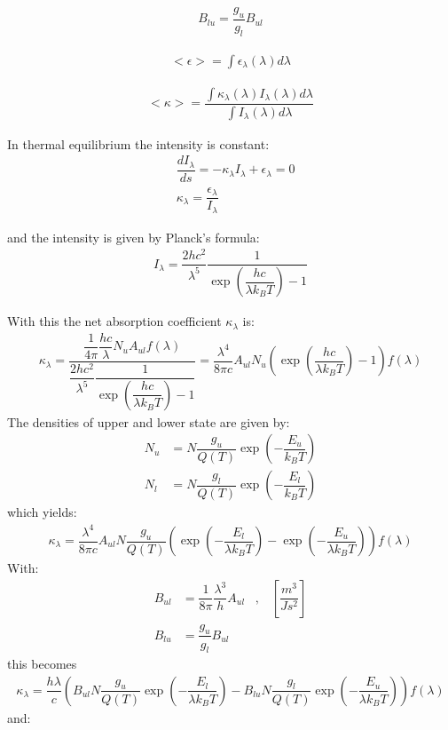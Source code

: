 \begin{align}
B_{lu} = \dfrac{g_u}{g_l} B_{ul}
\end{align}

\begin{align}
<\epsilon> = \int \epsilon_{\lambda}(\lambda) d\lambda
\end{align}

\begin{align}
<\kappa> = \dfrac{\int \kappa_{\lambda}(\lambda) I_{\lambda}(\lambda) d\lambda}{\int I_{\lambda}(\lambda) d\lambda}
\end{align}

In thermal equilibrium the intensity is constant:
\begin{align}
&\dfrac{d I_{\lambda}}{ds} = - \kappa_\lambda I_{\lambda} + 	\epsilon_\lambda = 0 \\
&\kappa_\lambda = \dfrac{\epsilon_\lambda}{I_{\lambda}}
\end{align}

and the intensity is given by Planck's formula:
\begin{align}
I_\lambda = \dfrac{2 h c^2}{\lambda^5} \dfrac{1}{\exp\left(\dfrac{h c}{\lambda k_B T}\right) - 1}
\end{align}

With this the net absorption coefficient $\kappa_\lambda$ is:
\begin{align}
\kappa_\lambda = \dfrac{\dfrac{1}{4 \pi} \dfrac{h c}{\lambda} N_u A_{ul} f(\lambda) }{\dfrac{2 h c^2}{\lambda^5} \dfrac{1}{\exp\left(\dfrac{h c}{\lambda k_B T}\right) - 1}} =
\dfrac{\lambda^4 }{8 \pi c} A_{ul} N_u  \left(\exp\left(\dfrac{h c}{\lambda k_B T}\right) - 1\right) f(\lambda)
\end{align}
The densities of upper and lower state are given by:
\begin{align}
N_u &= N \dfrac{g_u}{Q(T)} \exp\left(- \dfrac{E_u}{k_B T} \right) \\
N_l &= N \dfrac{g_l}{Q(T)} \exp\left(- \dfrac{E_l}{k_B T} \right)
\end{align}
which yields:
\begin{align}
\kappa_\lambda  =
\dfrac{\lambda^4 }{8 \pi c} A_{ul} N \dfrac{g_u}{Q(T)}
\left( \exp\left(-\dfrac{E_l}{\lambda k_B T}\right) - \exp\left(-\dfrac{E_u}{\lambda k_B T}\right) \right) f(\lambda)
\end{align}
With:
\begin{align}
B_{ul} &= \dfrac{1}{8 \pi} \dfrac{\lambda^3}{h} A_{ul} \;\;\; , \;\;\; \left[\dfrac{m^3}{J s^2}\right] \\
B_{lu} &= \dfrac{g_u}{g_l} B_{ul}
\end{align}
this becomes
\begin{align}
\kappa_\lambda  =
\dfrac{h \lambda }{c}  
\left(  B_{ul} N \dfrac{g_u}{Q(T)} \exp\left(-\dfrac{E_l}{\lambda k_B T}\right) - 
B_{lu} N \dfrac{g_l}{Q(T)} \exp\left(-\dfrac{E_u}{\lambda k_B T}\right) \right) f(\lambda)
\end{align}
and:

